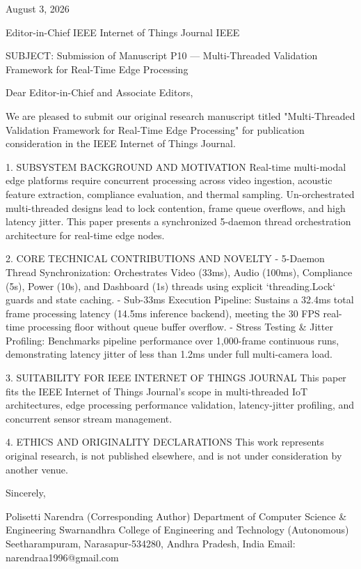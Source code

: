 August 3, 2026

Editor-in-Chief
IEEE Internet of Things Journal
IEEE

SUBJECT: Submission of Manuscript P10 — Multi-Threaded Validation Framework for Real-Time Edge Processing

Dear Editor-in-Chief and Associate Editors,

We are pleased to submit our original research manuscript titled "Multi-Threaded Validation Framework for Real-Time Edge Processing" for publication consideration in the IEEE Internet of Things Journal.

1. SUBSYSTEM BACKGROUND AND MOTIVATION
Real-time multi-modal edge platforms require concurrent processing across video ingestion, acoustic feature extraction, compliance evaluation, and thermal sampling. Un-orchestrated multi-threaded designs lead to lock contention, frame queue overflows, and high latency jitter. This paper presents a synchronized 5-daemon thread orchestration architecture for real-time edge nodes.

2. CORE TECHNICAL CONTRIBUTIONS AND NOVELTY
  - 5-Daemon Thread Synchronization: Orchestrates Video (33ms), Audio (100ms), Compliance (5s), Power (10s), and Dashboard (1s) threads using explicit `threading.Lock` guards and state caching.
  - Sub-33ms Execution Pipeline: Sustains a 32.4ms total frame processing latency (14.5ms inference backend), meeting the 30 FPS real-time processing floor without queue buffer overflow.
  - Stress Testing & Jitter Profiling: Benchmarks pipeline performance over 1,000-frame continuous runs, demonstrating latency jitter of less than 1.2ms under full multi-camera load.

3. SUITABILITY FOR IEEE INTERNET OF THINGS JOURNAL
This paper fits the IEEE Internet of Things Journal's scope in multi-threaded IoT architectures, edge processing performance validation, latency-jitter profiling, and concurrent sensor stream management.

4. ETHICS AND ORIGINALITY DECLARATIONS
This work represents original research, is not published elsewhere, and is not under consideration by another venue.

Sincerely,

Polisetti Narendra (Corresponding Author)
Department of Computer Science & Engineering
Swarnandhra College of Engineering and Technology (Autonomous)
Seetharampuram, Narasapur-534280, Andhra Pradesh, India
Email: narendraa1996@gmail.com
